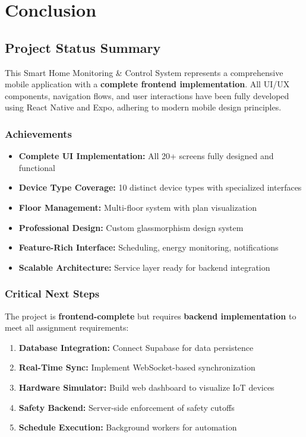 \documentclass[12pt,a4paper]{article}
\begin{document}
\newpage
\section{Conclusion}

\subsection{Project Status Summary}

This Smart Home Monitoring \& Control System represents a comprehensive mobile application with a \textbf{complete frontend implementation}. All UI/UX components, navigation flows, and user interactions have been fully developed using React Native and Expo, adhering to modern mobile design principles.

\subsubsection{Achievements}
\begin{itemize}[leftmargin=*]
    \item \textbf{Complete UI Implementation:} All 20+ screens fully designed and functional
    \item \textbf{Device Type Coverage:} 10 distinct device types with specialized interfaces
    \item \textbf{Floor Management:} Multi-floor system with plan visualization
    \item \textbf{Professional Design:} Custom glassmorphism design system
    \item \textbf{Feature-Rich Interface:} Scheduling, energy monitoring, notifications
    \item \textbf{Scalable Architecture:} Service layer ready for backend integration
\end{itemize}

\subsubsection{Critical Next Steps}
The project is \textbf{frontend-complete} but requires \textbf{backend implementation} to meet all assignment requirements:

\begin{enumerate}
    \item \textbf{Database Integration:} Connect Supabase for data persistence
    \item \textbf{Real-Time Sync:} Implement WebSocket-based synchronization
    \item \textbf{Hardware Simulator:} Build web dashboard to visualize IoT devices
    \item \textbf{Safety Backend:} Server-side enforcement of safety cutoffs
    \item \textbf{Schedule Execution:} Background workers for automation
\end{enumerate}
\end{document}
